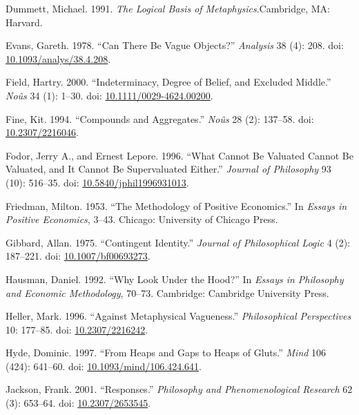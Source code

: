 \documentclass[
  10pt,
  letterpaper,
  DIV=11,
  numbers=noendperiod,
  twoside]{scrartcl}
\newlength{\cslhangindent}
\newenvironment{CSLReferences}[2] %
 {\begin{list}{}{%
  \setlength{\itemindent}{0pt}
  \setlength{\leftmargin}{0pt}
  \setlength{\parsep}{0pt}
  \ifodd #1
   \setlength{\leftmargin}{\cslhangindent}
   \setlength{\itemindent}{-1\cslhangindent}
  \fi
  \setlength{\itemsep}{#2\baselineskip}}}
 {\end{list}}
\begin{document}
\label{refs}
\begin{CSLReferences}{1}{0}
Dummett, Michael. 1991. \emph{The Logical Basis of
Metaphysics}.Cambridge, MA: Harvard.

Evans, Gareth. 1978. {``Can There Be Vague Objects?''} \emph{Analysis}
38 (4): 208. doi:
\href{https://doi.org/10.1093/analys/38.4.208}{10.1093/analys/38.4.208}.

Field, Hartry. 2000. {``Indeterminacy, Degree of Belief, and Excluded
Middle.''} \emph{No{û}s} 34 (1): 1--30. doi:
\href{https://doi.org/10.1111/0029-4624.00200}{10.1111/0029-4624.00200}.

Fine, Kit. 1994. {``Compounds and Aggregates.''} \emph{No{û}s} 28 (2):
137--58. doi: \href{https://doi.org/10.2307/2216046}{10.2307/2216046}.

Fodor, Jerry A., and Ernest Lepore. 1996. {``What Cannot Be Valuated
Cannot Be Valuated, and It Cannot Be Supervaluated Either.''}
\emph{Journal of Philosophy} 93 (10): 516--35. doi:
\href{https://doi.org/10.5840/jphil1996931013}{10.5840/jphil1996931013}.

Friedman, Milton. 1953. {``The Methodology of Positive Economics.''} In
\emph{Essays in Positive Economics}, 3--43. Chicago: University of
Chicago Press.

Gibbard, Allan. 1975. {``Contingent Identity.''} \emph{Journal of
Philosophical Logic} 4 (2): 187--221. doi:
\href{https://doi.org/10.1007/bf00693273}{10.1007/bf00693273}.

Hausman, Daniel. 1992. {``Why Look Under the Hood?''} In \emph{Essays in
Philosophy and Economic Methodology}, 70--73. Cambridge: Cambridge
University Press.

Heller, Mark. 1996. {``Against Metaphysical Vagueness.''}
\emph{Philosophical Perspectives} 10: 177--85. doi:
\href{https://doi.org/10.2307/2216242}{10.2307/2216242}.

Hyde, Dominic. 1997. {``From Heaps and Gaps to Heaps of Gluts.''}
\emph{Mind} 106 (424): 641--60. doi:
\href{https://doi.org/10.1093/mind/106.424.641}{10.1093/mind/106.424.641}.

Jackson, Frank. 2001. {``Responses.''} \emph{Philosophy and
Phenomenological Research} 62 (3): 653--64. doi:
\href{https://doi.org/10.2307/2653545}{10.2307/2653545}.


\end{CSLReferences}
\end{document}
